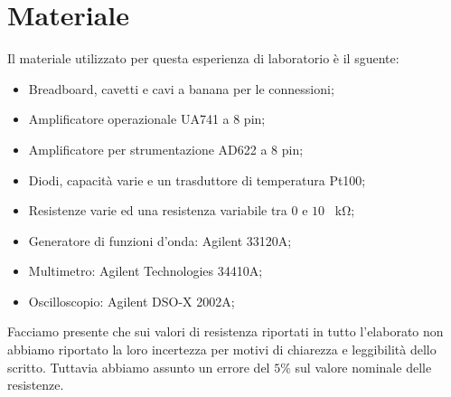 \section*{Materiale}

Il materiale utilizzato per questa esperienza di laboratorio è il sguente:

\begin{itemize} \itemsep2pt \parskip0pt 
    \item{Breadboard, cavetti e cavi a banana per le connessioni;}
    \item{Amplificatore operazionale UA741 a 8 pin;}
    \item{Amplificatore per strumentazione AD622 a 8 pin;}
    \item{Diodi, capacità varie e un trasduttore di temperatura Pt100;}
    \item{Resistenze varie ed una resistenza variabile tra $0$ e $10$ \SI{}{\kilo\ohm};}
    \item{Generatore di funzioni d'onda: Agilent 33120A;}
    \item{Multimetro: Agilent Technologies 34410A;}
    \item{Oscilloscopio: Agilent DSO-X 2002A;}
\end{itemize}

Facciamo presente che sui valori di resistenza riportati in tutto l'elaborato non abbiamo riportato la loro incertezza per motivi di chiarezza e leggibilità dello scritto. Tuttavia abbiamo assunto un errore del $5\%$ sul valore nominale delle resistenze.


